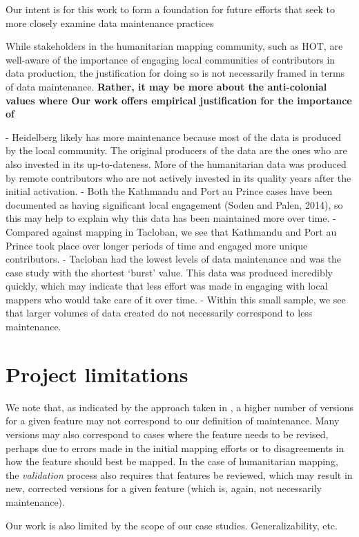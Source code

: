 Our intent is for this work to form a foundation for future efforts that seek to more closely examine data maintenance practices

While stakeholders in the humanitarian mapping community, such as HOT, are well-aware of the importance of engaging local communities of contributors in data production, the justification for doing so is not necessarily framed in terms of data maintenance. \textbf{Rather, it may be more about the anti-colonial values where 
Our work offers empirical justification for the importance of }

-	Heidelberg likely has more maintenance because most of the data is produced by the local community. The original producers of the data are the ones who are also invested in its up-to-dateness. More of the humanitarian data was produced by remote contributors who are not actively invested in its quality years after the initial activation. 
-	Both the Kathmandu and Port au Prince cases have been documented as having significant local engagement (Soden and Palen, 2014), so this may help to explain why this data has been maintained more over time. 
-	Compared against mapping in Tacloban, we see that Kathmandu and Port au Prince took place over longer periods of time and engaged more unique contributors. 
-	Tacloban had the lowest levels of data maintenance and was the case study with the shortest ‘burst’ value. This data was produced incredibly quickly, which may indicate that less effort was made in engaging with local mappers who would take care of it over time. 
-	Within this small sample, we see that larger volumes of data created do not necessarily correspond to less maintenance. 


\section{Project limitations}

We note that, as indicated by the approach taken in \textcite{mooney_characteristics_2012}, a higher number of versions for a given feature may not correspond to our definition of maintenance. Many versions may also correspond to cases where the feature needs to be revised, perhaps due to errors made in the initial mapping efforts or to disagreements in how the feature should best be mapped. In the case of humanitarian mapping, the \textit{validation} process also requires that features be reviewed, which may result in new, corrected versions for a given feature (which is, again, not necessarily maintenance). 

Our work is also limited by the scope of our case studies. Generalizability, etc. 



